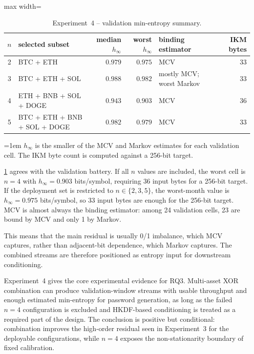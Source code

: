 \documentclass[11pt,titlepage,openany,oneside]{book}  %
\newcommand{\floatnote}[1]{%
  \par\smallskip\noindent%
  \begin{minipage}{\linewidth}%
    \footnotesize\emergencystretch=1em #1%
  \end{minipage}\par%
}
\begin{document}
\begin{table}[!htbp]
  \caption{Experiment~4 -- validation min-entropy summary.}
  \label{tab:exp4-min-entropy}
  \begin{center}
    \begin{adjustbox}{max width=\textwidth}
    \begin{tabular}{clrrlr}
      \toprule
      $n$ & selected subset & median $h_\infty$ & worst $h_\infty$ & binding estimator & IKM bytes \\
      \midrule
      2 & BTC + ETH                    & $0.979$ & $0.975$ & MCV & $33$ \\
      3 & BTC + ETH + SOL              & $0.988$ & $0.982$ & mostly MCV; worst Markov & $33$ \\
      4 & ETH + BNB + SOL + DOGE       & $0.943$ & $0.903$ & MCV & $36$ \\
      5 & BTC + ETH + BNB + SOL + DOGE & $0.982$ & $0.979$ & MCV & $33$ \\
      \bottomrule
    \end{tabular}
    \end{adjustbox}
  \end{center}
  \floatnote{$h_\infty$ is the smaller of the MCV and Markov estimates for each validation cell. The IKM byte count is computed against a 256-bit target.}
\end{table}

\cref{tab:exp4-min-entropy} agrees with the validation battery. If all $n$ values are included, the worst cell is $n=4$ with $h_\infty = 0.903$ bits/symbol, requiring 36 input bytes for a 256-bit target. If the deployment set is restricted to $n \in \{2,3,5\}$, the worst-month value is $h_\infty = 0.975$ bits/symbol, so 33 input bytes are enough for the 256-bit target. MCV is almost always the binding estimator: among 24 validation cells, 23 are bound by MCV and only 1 by Markov.

This means that the main residual is usually 0/1 imbalance, which MCV captures, rather than adjacent-bit dependence, which Markov captures. The combined streams are therefore positioned as entropy input for downstream conditioning.

Experiment~4 gives the core experimental evidence for RQ3. Multi-asset XOR combination can produce validation-window streams with usable throughput and enough estimated min-entropy for password generation, as long as the failed $n=4$ configuration is excluded and HKDF-based conditioning is treated as a required part of the design. The conclusion is positive but conditional: combination improves the high-order residual seen in Experiment~3 for the deployable configurations, while $n=4$ exposes the non-stationarity boundary of fixed calibration.
\end{document}
